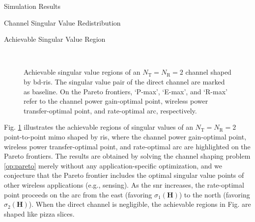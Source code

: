 \documentclass[journal]{IEEEtran}
\begin{document}
\begin{section}{Simulation Results}
	\begin{subsection}{Channel Singular Value Redistribution}
		\begin{subsubsection}{Achievable Singular Value Region}
			\begin{figure}[!t]
				\centering
				\\
				\caption{Achievable singular value regions of an $N_\mathrm{T}=N_\mathrm{R}=2$ channel shaped by \gls{bd}-\gls{ris}. The singular value pair of the direct channel are marked as baseline.
				On the Pareto frontiers, `P-max', `E-max', and `R-max' refer to the channel power gain-optimal point, wireless power transfer-optimal point, and rate-optimal arc, respectively.}
				\label{fg:singular_pareto}
			\end{figure}
			Fig. \ref{fg:singular_pareto} illustrates the achievable regions of singular values of an $N_\mathrm{T}=N_\mathrm{R}=2$ point-to-point \gls{mimo} shaped by \gls{ris}, where the channel power gain-optimal point, wireless power transfer-optimal point, and rate-optimal arc are highlighted on the Pareto frontiers.
			The results are obtained by solving the channel shaping problem \eqref{op:pareto} merely without any application-specific optimization, and we conjecture that the Pareto frontier includes the optimal singular value points of other wireless applications (e.g., sensing).
			As the \gls{snr} increases, the rate-optimal point proceeds on the arc from the east (favoring $\sigma_1(\mathbf{H})$) to the north (favoring $\sigma_2(\mathbf{H})$).
			When the direct channel is negligible, the achievable regions in Fig.  are shaped like pizza slices.

\end{subsubsection}
\end{subsection}
\end{section}
\end{document}
